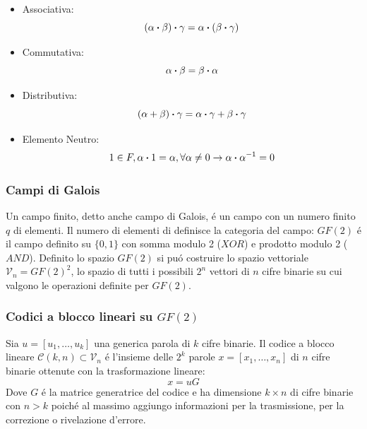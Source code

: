 \begin{itemize}
{\begin{itemize}
                            \item {Associativa:
                                \[
                                    (\alpha \dotproduct \beta) \dotproduct \gamma = \alpha \dotproduct( \beta \dotproduct \gamma)
                                \]
                            }
                            \item {Commutativa:
                                \[
                                    \alpha \dotproduct \beta = \beta \dotproduct \alpha
                                \]
                            }
                            \item {Distributiva:
                                \[
                                    (\alpha + \beta) \dotproduct \gamma = \alpha \dotproduct \gamma + \beta \dotproduct \gamma
                                \]
                            }
                            \item {Elemento Neutro:
                                \[
                                    1\in F,\alpha \dotproduct 1 = \alpha,\forall \alpha \neq 0\rightarrow \alpha\dotproduct\alpha^{-1} = 0
                                \]
                            }
                        \end{itemize}
                    }
                \end{itemize}
        \subsubsection{Campi di Galois}
            Un campo finito, detto anche campo di Galois, é un campo con un numero finito $q$ di elementi. Il numero di elementi di definisce la categoria del
            campo: $GF(2)$ é il campo definito su $\{0,1\}$ con somma modulo 2 ($XOR$) e prodotto modulo 2 ($AND$). Definito lo spazio $GF(2)$ si puó costruire
             lo spazio vettoriale $\mathcal{V}_n=GF(2)^2$, lo spazio di tutti i possibili $2^n$ vettori di $n$ cifre binarie su cui valgono le operazioni definite per 
             $GF(2)$.

        \subsubsection{Codici a blocco lineari su $GF(2)$}
            Sia $u = [u_1, \dots, u_k]$ una generica parola di $k$ cifre binarie. Il codice a blocco lineare $\mathcal{C}(k,n)\subset \mathcal{V}_n$ é l'insieme delle
            $2^k$ parole $x = [x_1, \dots, x_n]$ di $n$ cifre binarie ottenute con la trasformazione lineare:
            \[
                x = uG  
            \]
            Dove $G$ é la matrice generatrice del codice e ha dimensione $k \times n$ di cifre binarie con $n>k$ poiché al massimo
            aggiungo informazioni per la trasmissione, per la correzione o rivelazione d'errore.
            
